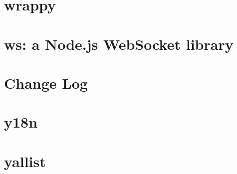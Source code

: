 \documentclass[twoside]{book}
\newcommand{\+}{\discretionary{\mbox{\scriptsize$\hookleftarrow$}}{}{}}
\begin{document}
\chapter{wrappy}
\label{md__c___users_vaishnavi_jadhav__desktop__developer_code_mean_stack_example_client_node_modules_wrappy__r_e_a_d_m_e}

\chapter{ws\+: a Node.\+js Web\+Socket library}
\label{md__c___users_vaishnavi_jadhav__desktop__developer_code_mean_stack_example_client_node_modules_ws__r_e_a_d_m_e}

\chapter{Change Log}
\label{md__c___users_vaishnavi_jadhav__desktop__developer_code_mean_stack_example_client_node_modules_y18n__c_h_a_n_g_e_l_o_g}

\chapter{y18n}
\label{md__c___users_vaishnavi_jadhav__desktop__developer_code_mean_stack_example_client_node_modules_y18n__r_e_a_d_m_e}

\chapter{yallist}
\label{md__c___users_vaishnavi_jadhav__desktop__developer_code_mean_stack_example_client_node_modules_yallist__r_e_a_d_m_e}

\end{document}
